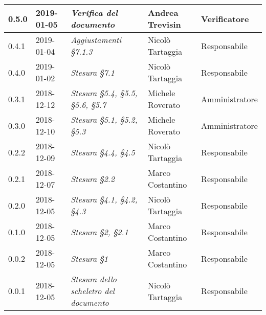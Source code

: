 \begin{longtable}{C{2cm}|C{2.5cm}|C{4.5cm}|C{2.5cm}|C{3cm}}
		0.5.0 & 2019-01-05 & \emph{Verifica del documento} & Andrea Trevisin & Verificatore \\
		\hline

		0.4.1 & 2019-01-04 & \emph{Aggiustamenti §7.1.3} & Nicolò Tartaggia & Responsabile \\
		\hline

		0.4.0 & 2019-01-02 & \emph{Stesura §7.1} & Nicolò Tartaggia & Responsabile \\
		\hline

		0.3.1 & 2018-12-12 & \emph{Stesura §5.4, §5.5, §5.6, §5.7} & Michele Roverato & Amministratore \\
		\hline

		0.3.0 & 2018-12-10 & \emph{Stesura §5.1, §5.2, §5.3} & Michele Roverato & Amministratore \\
		\hline

		0.2.2 & 2018-12-09 & \emph{Stesura §4.4, §4.5} & Nicolò Tartaggia & Responsabile \\
		\hline

		0.2.1 & 2018-12-07 & \emph{Stesura §2.2} & Marco Costantino & Responsabile \\
		\hline

		0.2.0 & 2018-12-05 & \emph{Stesura §4.1, §4.2, §4.3} & Nicolò Tartaggia & Responsabile \\
		\hline

		0.1.0 & 2018-12-05 & \emph{\textit{Stesura §2, §2.1}} & Marco Costantino & Responsabile \\
		\hline

		0.0.2 & 2018-12-05 & \emph{Stesura §1} & Marco Costantino & Responsabile \\
		\hline

		0.0.1 & 2018-12-05 & \emph{Stesura dello scheletro del documento} & Nicolò Tartaggia & Responsabile \\

	\end{longtable}

\clearpage
